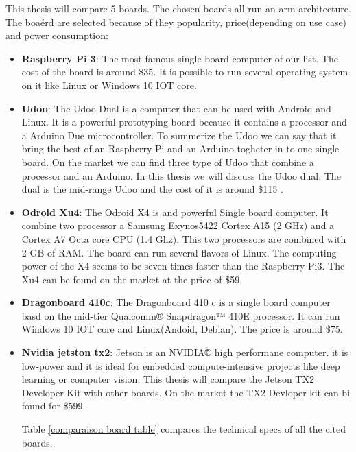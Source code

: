 \documentclass[english]{book_template} %
\begin{document}
This thesis will compare 5 boards. The chosen boards all run an arm architecture. The boaérd are selected because of they popularity, price(depending on use case) and power consumption:
\begin{itemize}
\item \textbf{Raspberry Pi 3}: The most famous single board computer of our list. The cost of the board is around \$35. It is possible to run several operating system on it like Linux or Windows 10 IOT core. \cite{Raspberr76:online}

\item \textbf{Udoo}: The Udoo Dual is a computer that can be used with Android and Linux. It is a powerful prototyping board because it contains a processor and a Arduino Due microcontroller. To summerize the Udoo we can say that it bring the best of an Raspberry Pi and an Arduino togheter in-to one single board.  \cite{maksimovic2014raspberry}
On the market we can find three type of Udoo that combine a processor and an Arduino. In this thesis we will discuss the Udoo dual. The dual is the mid-range Udoo and the cost of it is around \$115 \cite{DUALQUAD20:online}.

\item \textbf{Odroid Xu4}: The Odroid X4 is and powerful Single board computer. It combine two processor a Samsung Exynos5422 Cortex A15 (2 GHz) and a Cortex A7 Octa core CPU (1.4 Ghz). This two processors are combined with 2 GB of RAM. \cite{abdullah2016position} The board can run several flavors of Linux. The computing power of the X4 seems to be seven times faster than the Raspberry Pi3. 
The Xu4 can be found on the market at the price of \$59. \cite{ODROIDHa46:online}

\item \textbf{Dragonboard 410c}: The Dragonboard 410 c is a single board computer basd on the  mid-tier Qualcomm® Snapdragon™ 410E processor. It can run Windows 10 IOT core and Linux(Andoid, Debian). The price is around \$75. \cite{DRAGONBO86:online}  

\item \textbf{Nvidia jetston tx2}: Jetson is an NVIDIA® high performane computer. it is low-power and it is ideal for embedded compute-intensive projects like deep learning or computer vision. \cite{JetsonFA42:online}  This thesis will compare the Jetson TX2 Developer Kit  with other boards. On the market the TX2 Devloper kit can bi found for \$599.

Table \ref{comparaison board table} compares the technical specs of all the cited boards.
\newpage
  \null

\end{itemize}
\end{document}
